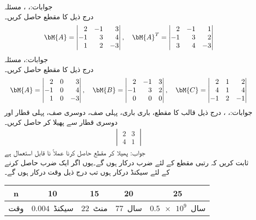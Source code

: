 جوابات:، ، 
\quad مسئلہ \\
درج ذیل کا مقطع حاصل کریں۔
\begin{align*}
\bM{A}=\begin{vmatrix*}[r] 2&-1&3\\-1&3&4\\1&2&-3 \end{vmatrix*}, \quad \bM{A}^T=\begin{vmatrix*}[r] 2&-1&1\\-1&3&2\\3&4&-3 \end{vmatrix*}
\end{align*}
جوابات:، 
\quad مسئلہ \\
درج ذیل کا مقطع حاصل کریں۔
\begin{align*}
\bM{A}=\begin{vmatrix*}[r] 2&0&3\\-1&0&4\\1&0&-3 \end{vmatrix*}, \quad \bM{B}=\begin{vmatrix*}[r] 2&-1&3\\-1&3&2\\0&0&0 \end{vmatrix*},\quad \bM{C}=\begin{vmatrix*}[r] 2&1&2\\4&1&4\\-1&2&-1 \end{vmatrix*}
\end{align*}
جوابات:، ، 
درج ذیل قالب کا مقطع، باری باری، پہلی صف، دوسری صف، پہلی قطار اور دوسری قطار سے پھیلا کر حاصل کریں۔
\begin{align*}
\begin{vmatrix}
2&3\\4&1
\end{vmatrix}
\end{align*}
جواب: 
\quad پھیلا کر مقطع حاصل کرنا عملاً نا قابل استعمال ہے\\
ثابت کریں کہ   رتبی مقطع کے لئے  ضرب درکار ہوں گے۔یوں اگر ایک ضرب حاصل کرنے کے لئے  سیکنڈ درکار ہوں تب درج ذیل وقت درکار ہوں گے۔
\begin{table}[h!]
\centering
\begin{tabular}{ccccc}
n&10&15&20&25\\
\hline
وقت& $0.004$\, سیکنڈ & $22$\, منٹ & $77$ \,سال & $\num{0.5e9}$ \,سال 
\end{tabular}
\end{table} 

